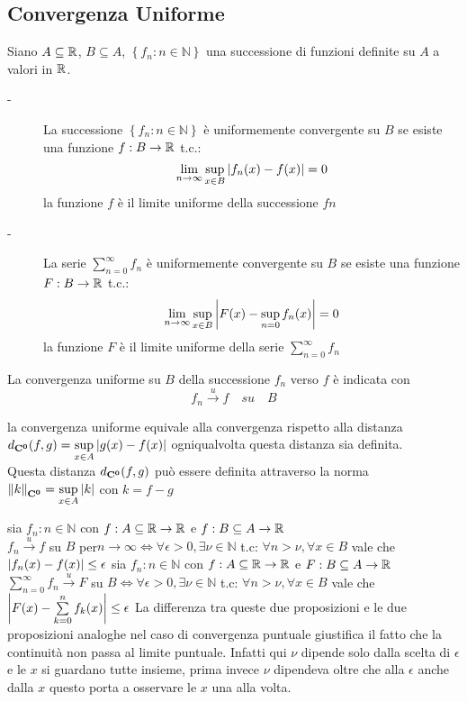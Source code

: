 \subsection{Convergenza Uniforme}
Siano $A\subseteq \mathbb{R}$, $B\subseteq A$, $\left\{f_n:n\in\mathbb{N}\right\}$ una successione di funzioni definite su $A$ a  valori in $ \mathbb{R}$.
\begin{description}
	\item[-] La successione $\left\{f_n:n\in\mathbb{N}\right\}$ è uniformemente convergente su $B$ se esiste una funzione $f:B\to \mathbb{R}$ t.c.:
	$$\lim\limits_{n\to\infty} \sup\limits_{x\in B}\left|f_n(x)-f(x)\right|=0$$
	la funzione $f$ è il limite uniforme della successione $fn$
	\item[-] La serie $\sum\limits_{n=0}^{\infty}f_n$ è uniformemente convergente su $B$ se esiste una funzione $F:B\to \mathbb{R}$ t.c.:
	$$\lim\limits_{n\to\infty} \sup\limits_{x\in B}\left|F(x)-\sup\limits_{n=0}f_n(x)\right|=0$$
	la funzione $F$ è il limite uniforme della serie $\sum\limits_{n=0}^{\infty}f_n$ 
\end{description}
\observation
La convergenza uniforme su $B$ della successione $f_n$ verso $f$ è indicata con
$$f_n\overset{u}{\to}f\quad su \quad B$$
\begin{observation}
	\label{obs:dist_conv_unif}
	la convergenza uniforme equivale alla convergenza rispetto alla distanza $d_{\mathbf{C^{0}}}(f,g)=\sup\limits_{x\in A}\left|g(x)-f(x)\right|$ ogniqualvolta questa distanza sia definita.\\
	Questa distanza $d_{\mathbf{C^{0}}}(f,g)$ può essere definita attraverso la norma $\left\|k\right\|_{\mathbf{C^{0}}}=\sup\limits_{x\in A}\left|k\right|$ con $k = f-g$
\end{observation}
\proposition
sia $f_n:n\in\mathbb{N}$ con $f:A\subseteq \mathbb{R}\to \mathbb{R}$ e $f:B\subseteq A \to  \mathbb{R}$\\
$f_n\overset{u}{\to}f$ su $B$ per$n\to\infty \Leftrightarrow \forall\epsilon >0, \exists\nu\in\mathbb{N}$  t.c: $\forall n>\nu, \forall x\in B$ vale che $\left|f_n(x)-f(x)\right|\le\epsilon$
\proposition
sia $f_n:n\in\mathbb{N}$ con $f:A\subseteq \mathbb{R}\to \mathbb{R}$ e $F:B\subseteq A \to  \mathbb{R}$\\
$\sum\limits_{n=0}^{\infty}f_n\overset{u}{\to}F$ su $B\Leftrightarrow \forall\epsilon >0, \exists\nu\in\mathbb{N}$  t.c: $\forall n>\nu, \forall x\in B$ vale che $\left|F(x)-\sum\limits_{k=0}^{n}f_k(x)\right|\le\epsilon$
\observation
La differenza tra queste due proposizioni e le due proposizioni analoghe nel caso di convergenza puntuale giustifica il fatto che la continuità non passa al limite puntuale. Infatti qui $\nu$ dipende solo dalla scelta di $\epsilon$ e le $x$ si guardano tutte insieme, prima invece $\nu$ dipendeva oltre che alla $\epsilon$ anche dalla $x$ questo porta a osservare le $x$ una alla volta.
